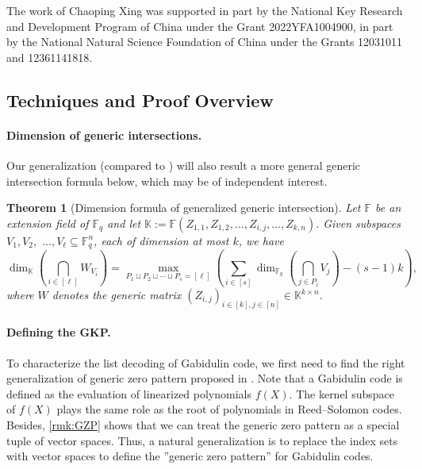 \documentclass[11pt]{article}
\theoremstyle{plain}
\newtheorem{thm}{Theorem}[section]
\theoremstyle{definition}
\theoremstyle{remark}
\newcommand{\F}{\mathbb{F}}
\begin{document}
The work of Chaoping Xing was supported in part by the National Key Research and Development Program of China under the Grant 2022YFA1004900, in part by the National Natural Science Foundation of China under the Grants 12031011 and 12361141818.




\subsection{Techniques and Proof Overview}

\paragraph{Dimension of generic intersections.} Our generalization (compared to \cite{brakensiek2023generic}) will also result a more general generic intersection formula below, which may be of independent interest.
\begin{thm}[Dimension formula of generalized generic intersection]\label{gintersec}
Let $\F$ be an extension field of $\F_q$ and let $\mathbb{K}:=\F(Z_{1,1},Z_{1,2},\dots,Z_{i,j},\dots,Z_{k,n}).$ Given subspaces $V_1,V_2,$ $\dots,V_\ell\subseteq \F_q^n$, each of dimension at most $k$, we have
   \begin{equation} %
\dim_{\mathbb{K}}\left(\bigcap_{i\in[\ell]}W_{V_i}\right)=\max_{P_1\sqcup P_2\sqcup \cdots\sqcup P_s=[\ell]}\left(\sum_{i\in[s]}\dim_{\F_q}\left(\bigcap_{j\in P_i}V_j\right)-(s-1)k\right),
\end{equation} 
where $W$ denotes the generic matrix $(Z_{i,j})_{i\in [k], j\in [n]}\in \mathbb{K}^{k\times n}$.
\end{thm}


\paragraph{Defining the GKP.}  To characterize the list decoding of Gabidulin code, we first need to find the right generalization of generic zero pattern proposed in \cite{brakensiek2023generic}. Note that a Gabidulin code is defined as the evaluation of linearized polynomials $f(X)$. The kernel subspace of $f(X)$ plays the same role as the root of polynomials in Reed--Solomon codes. Besides, \cref{rmk:GZP} shows that we can treat the generic zero pattern as a special tuple of vector spaces. Thus, a natural generalization is to replace the index sets with vector spaces to define the ''generic zero pattern'' for Gabidulin codes. 
\end{document}
